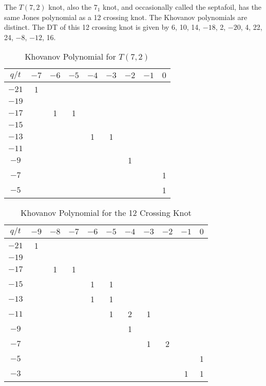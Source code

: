 \documentclass{article}
\theoremstyle{plain}
\begin{document}
        The $T(7,2)$ knot, also the $7_{1}$ knot, and occasionally called the
        septafoil, has the same Jones polynomial as a 12 crossing knot. The
        Khovanov polynomials are distinct. The DT of this 12 crossing knot is
        given by 6, 10, 14, $-18$, 2, $-20$, 4, 22, 24, $-8$, $-12$, 16.
        \begin{table}[H]
            \centering
            \begin{tabular}{| c | c | c | c | c | c | c | c | c |}
                \hline
                $q/t$&$-7$&$-6$&$-5$&$-4$&$-3$&$-2$&$-1$&$0$\\
                \hline
                $-21$&1&&&&&&&\\
                \hline
                $-19$&&&&&&&&\\
                \hline
                $-17$&&1&1&&&&&\\
                \hline
                $-15$&&&&&&&&\\
                \hline
                $-13$&&&&1&1&&&\\
                \hline
                $-11$&&&&&&&&\\
                \hline
                $-9$&&&&&&1&&\\
                \hline
                $-7$&&&&&&&&1\\
                \hline
                $-5$&&&&&&&&1\\
                \hline
            \end{tabular}
            \caption{Khovanov Polynomial for $T(7,2)$}
        \end{table}
        \begin{table}[H]
            \centering
            \begin{tabular}{| c | c | c | c | c | c | c | c | c | c | c |}
                \hline
                $q/t$&$-9$&$-8$&$-7$&$-6$&$-5$&$-4$&$-3$&$-2$&$-1$&$0$\\
                \hline
                $-21$&1&&&&&&&&&\\
                \hline
                $-19$&&&&&&&&&&\\
                \hline
                $-17$&&1&1&&&&&&&\\
                \hline
                $-15$&&&&1&1&&&&&\\
                \hline
                $-13$&&&&1&1&&&&&\\
                \hline
                $-11$&&&&&1&2&1&&&\\
                \hline
                $-9$&&&&&&1&&&&\\
                \hline
                $-7$&&&&&&&1&2&&\\
                \hline
                $-5$&&&&&&&&&&1\\
                \hline
                $-3$&&&&&&&&&1&1\\
                \hline
            \end{tabular}
            \caption{Khovanov Polynomial for the 12 Crossing Knot}
        \end{table}
\end{document}
